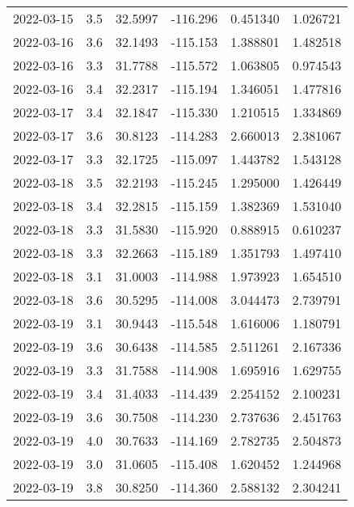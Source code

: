 \begin{tabular}{lrrrrr}
2022-03-15 &       3.5 &  32.5997 &  -116.296 &         0.451340 &         1.026721 \\
2022-03-16 &       3.6 &  32.1493 &  -115.153 &         1.388801 &         1.482518 \\
2022-03-16 &       3.3 &  31.7788 &  -115.572 &         1.063805 &         0.974543 \\
2022-03-16 &       3.4 &  32.2317 &  -115.194 &         1.346051 &         1.477816 \\
2022-03-17 &       3.4 &  32.1847 &  -115.330 &         1.210515 &         1.334869 \\
2022-03-17 &       3.6 &  30.8123 &  -114.283 &         2.660013 &         2.381067 \\
2022-03-17 &       3.3 &  32.1725 &  -115.097 &         1.443782 &         1.543128 \\
2022-03-18 &       3.5 &  32.2193 &  -115.245 &         1.295000 &         1.426449 \\
2022-03-18 &       3.4 &  32.2815 &  -115.159 &         1.382369 &         1.531040 \\
2022-03-18 &       3.3 &  31.5830 &  -115.920 &         0.888915 &         0.610237 \\
2022-03-18 &       3.3 &  32.2663 &  -115.189 &         1.351793 &         1.497410 \\
2022-03-18 &       3.1 &  31.0003 &  -114.988 &         1.973923 &         1.654510 \\
2022-03-18 &       3.6 &  30.5295 &  -114.008 &         3.044473 &         2.739791 \\
2022-03-19 &       3.1 &  30.9443 &  -115.548 &         1.616006 &         1.180791 \\
2022-03-19 &       3.6 &  30.6438 &  -114.585 &         2.511261 &         2.167336 \\
2022-03-19 &       3.3 &  31.7588 &  -114.908 &         1.695916 &         1.629755 \\
2022-03-19 &       3.4 &  31.4033 &  -114.439 &         2.254152 &         2.100231 \\
2022-03-19 &       3.6 &  30.7508 &  -114.230 &         2.737636 &         2.451763 \\
2022-03-19 &       4.0 &  30.7633 &  -114.169 &         2.782735 &         2.504873 \\
2022-03-19 &       3.0 &  31.0605 &  -115.408 &         1.620452 &         1.244968 \\
2022-03-19 &       3.8 &  30.8250 &  -114.360 &         2.588132 &         2.304241 \\

\end{tabular}
